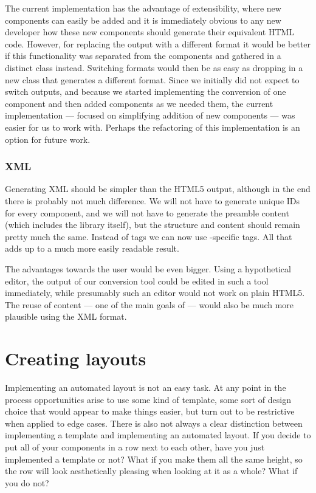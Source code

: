      The current implementation has the advantage of extensibility, where new
     components can easily be added and it is immediately obvious to any new
     developer how these new components should generate their equivalent HTML
     code. However, for replacing the output with a different format it would
     be better if this functionality was separated from the components and
     gathered in a distinct  class instead. Switching formats
     would then be as easy as dropping in a new  class that
     generates a different format. Since we initially did not expect to switch
     outputs, and because we started implementing the conversion of one
     component and then added components as we needed them, the current
     implementation --- focused on simplifying addition of new components ---
     was easier for us to work with. Perhaps the refactoring of this
     implementation is an option for future work.

    \subsubsection{\mxp XML}

     Generating \mxp XML should be simpler than the HTML5 output, although in
     the end there is probably not much difference. We will not have to generate
     unique IDs for every component, and we will not have to generate the
     preamble content (which includes the \mxp library itself), but the
     structure and content should remain pretty much the same. Instead of
      tags we can now use \mxp-specific tags. All that adds up to a
     much more easily readable result.

     The advantages towards the user would be even bigger. Using a hypothetical
     \mxp editor, the output of our conversion tool could be edited in such a
     tool immediately, while presumably such an editor would not work on plain
     HTML5. The reuse of content --- one of the main goals of \mxp --- would
     also be much more plausible using the XML format.

  \section{Creating layouts}

   Implementing an automated layout is not an easy task. At any point in the
   process opportunities arise to use some kind of template, some sort of
   design choice that would appear to make things easier, but turn out to be
   restrictive when applied to edge cases. There is also not always a clear
   distinction between implementing a template and implementing an automated
   layout. If you decide to put all of your components in a row next to each
   other, have you just implemented a template or not? What if you make them
   all the same height, so the row will look aesthetically pleasing when
   looking at it as a whole? What if you do not?

